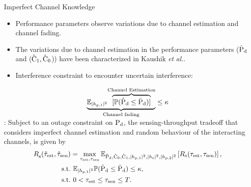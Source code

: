 \documentclass[12pt]{beamer}
\newcommand{\fs}[2]{\fontsize{#1 pt}{#2}\selectfont}
\begin{document}
\begin{frame}{Imperfect Channel Knowledge}
	\fs{8}{8}
                \begin{center}
		\begin{itemize}
                \item Performance parameters observe variations due to channel estimation and channel fading. 
                \item The variations due to channel estimation in the performance parameters ($\hat{\text{P}}_{\text{d}}$ and ($\hat{\text{C}}_1, \hat{\text{C}}_0$)) have been characterized in Kaushik \textit{et al.}. 
		\item Interference constraint to encounter uncertain interference: 
                \end{itemize}
		\begin{align*}
			\smash[b]{\underbrace{\mathbb{E}_{|h_{\text{p,1}}|^2}{\smash[b]{\overbrace{[\mathbb P( \hat{\text{P}}_{\text{d}} \le \bar{\text{P}}_{\text{d}})]}^{\text{Channel Estimation}}}}}_{\text{Channel fading}}} &\le \kappa \\[0.2cm] 
\end{align*}

		\begin{mdframed}[style=MyFrame, frametitle=Estimation Model (EM)] : Subject to an outage constraint on $\text{P}_{\text{d}}$, the sensing-throughput tradeoff that considers imperfect channel estimation and random behaviour of the interacting channels, is given by
                \begin{align*}
			{R}_{\text{s}}^{\text{}}(\tilde{\tau}_{\text{est}}, \tilde{\tau}_{\text{sen}}) &= \operatorname*{max}_{\tau_{\text{est}}, \tau_{\text{sen}}} {\mathbb E}_{\hat{\text{P}}_{\text{d}}, \hat{\text{C}}_0, \hat{\text{C}}_1, |h_{\text{p,1}}|^2, |h_{\text{s}}|^2, |h_{\text{p,2}}|^2}\left[ R_{\text{s}}(\tau_{\text{est}}, \tau_{\text{sen}}) \right], \nonumber \\ 
			\text{s.t.} & \text{ }  \mathbb{E}_{|h_{\text{p,1}}|^2}\mathbb P( \hat{\text{P}}_{\text{d}} \le \bar{\text{P}}_{\text{d}})  \le \kappa, \\
			\text{s.t.} & \text{ }  0 < \tau_{\text{est}} \le \tau_{\text{sen}} \le T.
		\end{align*}
		\end{mdframed}
                \end{center}
\end{frame}
\end{document}
